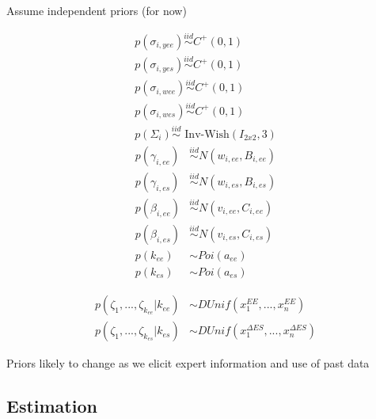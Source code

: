 \documentclass[handout]{beamer}\usepackage[]{graphicx}\usepackage[]{color}
\begin{document}
\begin{frame}
Assume independent priors (for now)

\begin{multicols}{2}
\begin{align}
p(\sigma_{i,yee}) \overset{iid}{\sim} C^+(0,1) \\
p(\sigma_{i,yes}) \overset{iid}{\sim} C^+(0,1) \\
p(\sigma_{i,wee}) \overset{iid}{\sim} C^+(0,1) \\
p(\sigma_{i,wes}) \overset{iid}{\sim} C^+(0,1) \\
p(\Sigma_i) \overset{iid}{\sim} \text{ Inv-Wish}(I_{2x2},3) 
\end{align}
\columnbreak
\begin{align}
p(\gamma_{i,ee}) &\overset{iid}{\sim} N(w_{i,ee},B_{i,ee}) \\
p(\gamma_{i,es}) &\overset{iid}{\sim} N(w_{i,es},B_{i,es}) \\
p(\beta_{i,ee}) &\overset{iid}{\sim} N(v_{i,ee},C_{i,ee}) \\
p(\beta_{i,es}) &\overset{iid}{\sim} N(v_{i,es},C_{i,es}) \\
p(k_{ee}) &{\sim} Poi(a_{ee}) \\
p(k_{es}) &{\sim} Poi(a_{es}) 
\end{align}
\end{multicols}
\begin{align}
p(\zeta_1,...,\zeta_{k_{ee}}|k_{ee}) &\sim DUnif(x_1^{EE},...,x_n^{EE}) \\
p(\zeta_1,...,\zeta_{k_{es}}|k_{es}) &\sim DUnif(x_1^{\Delta ES},...,x_n^{\Delta ES})
\end{align}

Priors likely to change as we elicit expert information and use of past data

\end{frame}

\subsection{Estimation}
\end{document}
